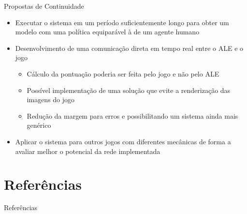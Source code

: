 \documentclass[aspectratio=169]{beamer}
\begin{document}
\begin{frame}{Propostas de Continuidade}
	\begin{block}{}
		\begin{itemize}
			\item Executar o sistema em um período suficientemente longo para obter um modelo com uma política equiparável à de um agente humano
			\item Desenvolvimento de uma comunicação direta em tempo real entre o ALE e o jogo
			\begin{itemize}
				\item Cálculo da pontuação poderia ser feita pelo jogo e não pelo ALE
				\item Possível implementação de uma solução que evite a renderização das imagens do jogo
				\item Redução da margem para erros e possibilitando um sistema ainda mais genérico
			\end{itemize}
			\item Aplicar o sistema para outros jogos com diferentes mecânicas de forma a avaliar melhor o potencial da rede implementada

		\end{itemize}
	\end{block}
\end{frame}


\section{Referências}


\begin{frame}[allowframebreaks]{Referências}

\end{frame}

\end{document}
